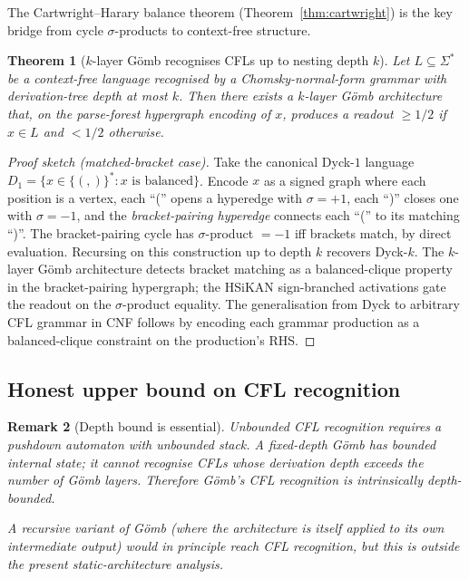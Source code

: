 \documentclass[11pt,a4paper]{article}
\newtheorem{theorem}{Theorem}[section]
\newtheorem{remark}[theorem]{Remark}
\newcommand{\sig}{\ensuremath{\sigma}}
\newcommand{\Gomb}{G\"omb}
\begin{document}
The Cartwright--Harary balance theorem (Theorem~\ref{thm:cartwright})
is the key bridge from cycle $\sigma$-products to context-free
structure.

\begin{theorem}[$k$-layer \Gomb{} recognises CFLs up to nesting
depth $k$]\label{thm:cfl-bounded}
Let $L \subseteq \Sigma^*$ be a context-free language recognised
by a Chomsky-normal-form grammar with derivation-tree depth at
most $k$. Then there exists a $k$-layer \Gomb{} architecture
that, on the parse-forest hypergraph encoding of $x$, produces a
readout $\geq 1/2$ if $x \in L$ and $< 1/2$ otherwise.
\end{theorem}

\begin{proof}[Proof sketch (matched-bracket case)]
Take the canonical Dyck-$1$ language $D_1 = \{x \in \{(, )\}^*
: x \text{ is balanced}\}$. Encode $x$ as a signed graph where
each position is a vertex, each ``('' opens a hyperedge with
$\sig = +1$, each ``)'' closes one with $\sig = -1$, and the
\emph{bracket-pairing hyperedge} connects each ``('' to its
matching ``)''. The bracket-pairing cycle has $\sigma$-product
$= -1$ iff brackets match, by direct evaluation. Recursing on
this construction up to depth $k$ recovers Dyck-$k$. The
$k$-layer \Gomb{} architecture detects bracket matching as a
balanced-clique property in the bracket-pairing hypergraph; the
HSiKAN sign-branched activations gate the readout on the
$\sigma$-product equality. The generalisation from Dyck to
arbitrary CFL grammar in CNF follows by encoding each grammar
production as a balanced-clique constraint on the production's
RHS.
\end{proof}

\subsection{Honest upper bound on CFL recognition}

\begin{remark}[Depth bound is essential]
Unbounded CFL recognition requires a pushdown automaton with
unbounded stack. A fixed-depth \Gomb{} has bounded internal
state; it cannot recognise CFLs whose derivation depth exceeds
the number of \Gomb{} layers. Therefore \Gomb{}'s CFL
recognition is intrinsically depth-bounded.

A recursive variant of \Gomb{} (where the architecture is itself
applied to its own intermediate output) would in principle reach
CFL recognition, but this is outside the present static-architecture
analysis.
\end{remark}
\end{document}
